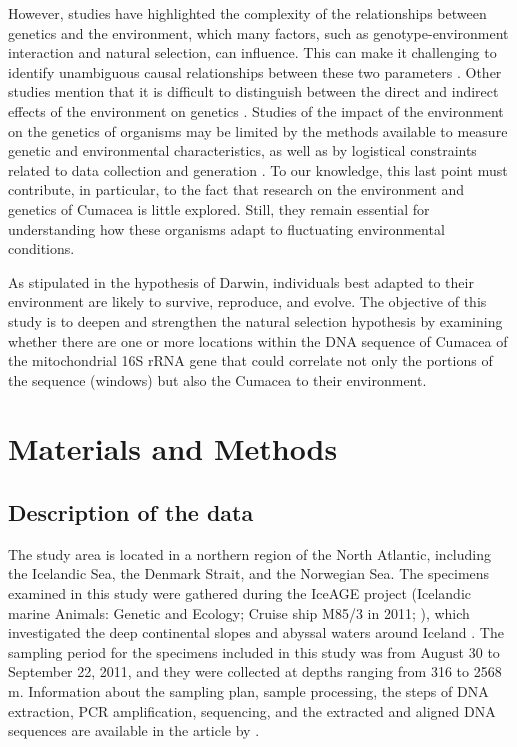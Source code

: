 However, studies have highlighted the complexity of the relationships between genetics and the environment, which many factors, such as genotype-environment interaction and natural selection, can influence. This can make it challenging to identify unambiguous causal relationships between these two parameters \citep{balkenhol_identifying_2009}. Other studies mention that it is difficult to distinguish between the direct and indirect effects of the environment on genetics \citep{manel_perspectives_2010,balkenhol_landscape_2019}. Studies of the impact of the environment on the genetics of organisms may be limited by the methods available to measure genetic and environmental characteristics, as well as by logistical constraints related to data collection and generation \citep{manel_perspectives_2010,shafer_widespread_2013}. To our knowledge, this last point must contribute, in particular, to the fact that research on the environment and genetics of Cumacea is little explored. Still, they remain essential for understanding how these organisms adapt to fluctuating environmental conditions. 

As stipulated in the hypothesis of Darwin, individuals best adapted to their environment are likely to survive, reproduce, and evolve. The objective of this study is to deepen and strengthen the natural selection hypothesis by examining whether there are one or more locations within the DNA sequence of Cumacea of the mitochondrial 16S rRNA gene that could correlate not only the portions of the sequence (windows) but also the Cumacea to their environment.

\section{Materials and Methods}\label{materials-methods}

\subsection{Description of the data}
The study area is located in a northern region of the North Atlantic, including the Icelandic Sea, the Denmark Strait, and the Norwegian Sea. The specimens examined in this study were gathered during the IceAGE project (Icelandic marine Animals: Genetic and Ecology; Cruise ship M85/3 in 2011; \citep{brix_iceage_2014}), which investigated the deep continental slopes and abyssal waters around Iceland \citep{meisner_prefacebiodiversity_2018}. The sampling period for the specimens included in this study was from August 30 to September 22, 2011, and they were collected at depths ranging from 316 to 2568 m.  Information about the sampling plan, sample processing, the steps of DNA extraction, PCR amplification, sequencing, and the extracted and aligned DNA sequences are available in the article by \citep{uhlir_adding_2021}.

